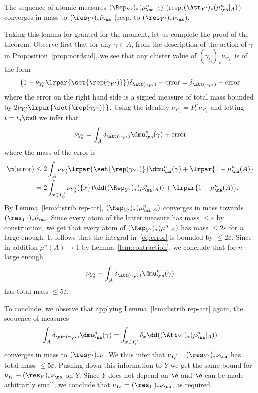 \begin{lemm}\label{lem:distrib rep-att}
The sequence of atomic measures $(\Rep_{Y'})_*(\mu^n_\na|_{A}) $ (resp.\linebreak $(\Att_{Y'})_*(\mu^n_\na|_{A}) $) converges in mass to $(\res_{Y'})_*\check\nu_\na$ (resp. to $(\res_{Y'})_*\nu_\na$).
\end{lemm}

Taking this lemma for granted for the moment, let us complete the proof of the theorem. Observe first that for any $\gamma \in A$, from the description of the action of $\gamma$ in Proposition~\ref{prop:nordsud}, we see that any cluster value of $(\gamma_{t_j})_*\nu_{Y'_{t_j}}$ is of the form
\[
\big(1- \nu_{Y'_0}\lrpar{\set{\rep(\gamma_{Y'})}}\big) \delta_{\att(\gamma_{Y'})} + \mathrm{error}
=
\delta_{\att(\gamma_{Y'})} + \mathrm{error}
\]
where the error on the right hand side is a signed measure of total mass bounded by $ 2 \nu_{Y'_0}\lrpar{\set{\rep(\gamma_{Y'})}}$. Using the identity $\nu_{Y'_t} = P_t^n\nu_{Y'_t}$ and letting $t=t_j\cv0$ we infer that
\begin{equation}\label{eq:limit stationary}
\nu_{Y'_0} = \int_{A} \delta_{\att(\gamma_{Y'})} \dmu_\na^n(\gamma) + \mathrm{error}
\end{equation}
where the mass of the error is
\begin{align}
\notag \m(\mathrm{error}) & \leq 2 \int_{A} \nu_{Y'_0}\lrpar{\set{\rep(\gamma_{Y'})}} \dmu_\na^n(\gamma) +
\lrpar{1 -\mu_\na^n(A)} \\\label{eq:error}
&= 2 \int_{x\in Y'_0} \nu_{Y'_0}(\{ x \}) \dd \!\left((\Rep_{Y'})_*(\mu_\na^n|_{A})\right)+ \lrpar{1 -\mu_\na^n(A)}.
\end{align}
By Lemma~\ref{lem:distrib rep-att}, $(\Rep_{Y'})_*(\mu_\na^n|_{A})$ converges in mass towards $(\res_{Y'})_*\check\nu_\na$. Since every atom of the latter measure has mass $\le \varepsilon$ by construction, we get that every atom of $(\Rep_{Y'})_*(\mu^n|_{A})$ has mass $\le 2\varepsilon$ for $n$ large enough. It follows that the integral in~\eqref{eq:error} is bounded by $\le 2 \varepsilon$. Since in addition $\mu^n(A) \to 1$ by Lemma~\ref{lem:contraction}, we conclude that for $n$ large enough
\begin{equation}
\nu_{Y'_0} - \int_{A} \delta_{\att(\gamma_{Y'})} \dmu_\na^n(\gamma)
\end{equation}
has total mass $\le 5 \varepsilon$.

To conclude, we observe that applying Lemma~\ref{lem:distrib rep-att} again, the sequence of measures
\[
\int_{A} \delta_{\att(\gamma_{Y'})} \dmu_\na^n(\gamma) = \int_{x\in Y'_0} \delta_x \dd\!\left((\Att_{Y'})_*(\mu_\na^n|_{A})\right)
\]
converges in mass to $(\res_{Y'})_*\nu$. We thus infer that $ \nu_{Y'_0} - (\res_{Y'})_*\nu_\na$ has total mass $\le 5 \varepsilon$. Pushing down this information to $Y$ we get the same bound for $\nu_{Y_0} - (\res_{Y})_*\nu_\na$ on $Y$. Since $Y$ does not depend on $\e$ and $\e$ can be made arbitrarily small, we conclude that $\nu_{Y_0} = (\res_{Y})_*\nu_\na$, as required.

